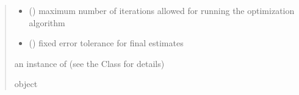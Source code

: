 \documentclass[letterpaper,10pt,english]{sphinxmanual}
\begin{document}
\begin{fulllineitems}
\begin{quote}
\begin{description}
\begin{itemize}
\item {} 
\sphinxAtStartPar
{} () \textendash{} maximum number of iterations allowed for running the optimization algorithm

\item {} 
\sphinxAtStartPar
{} () \textendash{} fixed error tolerance for final estimates

\end{itemize}

\sphinxAtStartPar
an instance of  (see the Class for details)

\sphinxAtStartPar
object

\end{description}\end{quote}

\end{fulllineitems}

\end{document}
